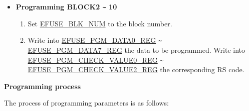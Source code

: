 \documentclass[main\_\_EN.tex]{subfiles}
\begin{document}
\begin{itemize}
\begin{enumerate}
    \end{enumerate}
    \item {\bfseries Programming BLOCK2 \verb+~+ 10}
    \begin{enumerate}
        \item Set \hyperref[fielddesc:EFUSEBLKNUM]{EFUSE\_BLK\_NUM} to the block number.
        \item Write into \hyperref[regdesc:EFUSEPGMDATA0REG]{EFUSE\_PGM\_DATA0\_REG} \verb+~+ \hyperref[regdesc:EFUSEPGMDATA7REG]{EFUSE\_PGM\_DATA7\_REG} the data to be programmed. Write into \hyperref[regdesc:EFUSEPGMCHECKVALUE0REG]{EFUSE\_PGM\_CHECK\_VALUE0\_REG}  \verb+~+ \hyperref[regdesc:EFUSEPGMCHECKVALUE2REG]{EFUSE\_PGM\_CHECK\_VALUE2\_REG} the corresponding RS code.
    \end{enumerate}
\end{itemize}

{\bfseries Programming process}

The process of programming parameters is as follows:
\end{document}
